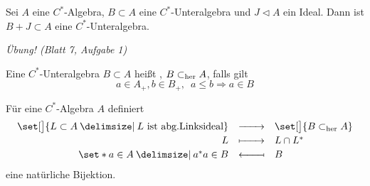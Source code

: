 \begin{proposition}[{name=[Summe von C*-Unteralgebra mit Ideal]}]
	Sei $A$ eine $C^*$-Algebra, $B \subset A$ eine $C^*$-Unteralgebra und $J \lhd A$ ein Ideal. Dann ist $B+J \subset A$ eine $C^*$-Unteralgebra.
\end{proposition}
\begin{beweis}
	\emph{Übung! (Blatt 7, Aufgabe 1)}
\end{beweis}

\begin{definition}[{name=[hereditäre C*-Unteralgebra]}]
	Eine $C^*$-Unteralgebra $B \subset A$ heißt , $B \subset_{\operatorname{her}} A$, falls gilt
	\[
		a \in A_+, b \in B_+, \enspace a \le b \Longrightarrow a \in B
	\]
\end{definition}

\begin{satz}[label=satz:49,{name=[Bijektion abgeschlossene Linksideale und hereditäre C*-Algebren]}]
	Für eine $C^*$-Algebra $A$ definiert
	\[
		\begin{array}{rcl}
			\set[\big]{L \subset A \given L \text{ ist abg.Linksideal} } &\xrightarrow{\minwidthbox{ }{2em}} & \set[\big]{B \subher A} \\[0.5ex]
			\textstyle L &\xmapsto{\minwidthbox{\mbox{ }}{2em}} & \textstyle L \cap L^* \\[0.5ex]
			\textstyle \set*{a \in A \given a^*a \in B} &\reflectbox{\ensuremath{\xmapsto{\minwidthbox{\mbox{ }}{2em}}}} & \textstyle B 
		\end{array}
	\]
	eine natürliche Bijektion.
\end{satz}
